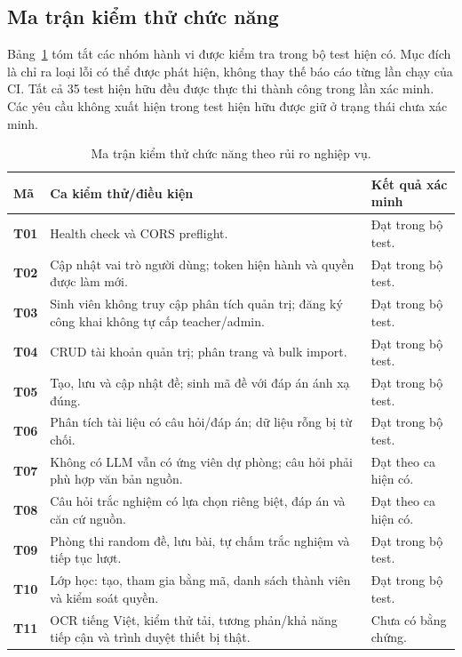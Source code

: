 \subsection{Ma trận kiểm thử chức năng}
Bảng~\ref{tab:ma-tran-kiem-thu} tóm tắt các nhóm hành vi được kiểm tra
trong bộ test hiện có. Mục đích là chỉ ra loại lỗi có thể được phát hiện,
không thay thế báo cáo từng lần chạy của CI. Tất cả 35 test hiện hữu đều
được thực thi thành công trong lần xác minh. Các yêu cầu không xuất hiện
trong test hiện hữu được giữ ở trạng thái chưa xác minh.
\begin{table}[H]
\centering
\caption{Ma trận kiểm thử chức năng theo rủi ro nghiệp vụ.}
\label{tab:ma-tran-kiem-thu}
\begin{tabularx}{\textwidth}{>{\bfseries\color{daunavy}}p{} X p{}}
\toprule
\rowcolor{gray100}Mã & Ca kiểm thử/điều kiện & Kết quả xác minh \\
\midrule
T01 & Health check và CORS preflight. & Đạt trong bộ test. \\
T02 & Cập nhật vai trò người dùng; token hiện hành và quyền được làm mới. & Đạt trong bộ test. \\
T03 & Sinh viên không truy cập phân tích quản trị; đăng ký công khai không tự cấp teacher/admin. & Đạt trong bộ test. \\
T04 & CRUD tài khoản quản trị; phân trang và bulk import. & Đạt trong bộ test. \\
T05 & Tạo, lưu và cập nhật đề; sinh mã đề với đáp án ánh xạ đúng. & Đạt trong bộ test. \\
T06 & Phân tích tài liệu có câu hỏi/đáp án; dữ liệu rỗng bị từ chối. & Đạt trong bộ test. \\
T07 & Không có LLM vẫn có ứng viên dự phòng; câu hỏi phải phù hợp văn bản nguồn. & Đạt theo ca hiện có. \\
T08 & Câu hỏi trắc nghiệm có lựa chọn riêng biệt, đáp án và căn cứ nguồn. & Đạt theo ca hiện có. \\
T09 & Phòng thi random đề, lưu bài, tự chấm trắc nghiệm và tiếp tục lượt. & Đạt trong bộ test. \\
T10 & Lớp học: tạo, tham gia bằng mã, danh sách thành viên và kiểm soát quyền. & Đạt trong bộ test. \\
T11 & OCR tiếng Việt, kiểm thử tải, tương phản/khả năng tiếp cận và trình duyệt thiết bị thật. & Chưa có bằng chứng. \\
\bottomrule
\end{tabularx}
\end{table}

